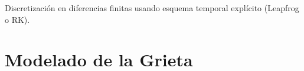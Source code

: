 \documentclass[a4paper,10pt]{exam}
\begin{document}
Discretización en diferencias finitas usando esquema temporal explícito (Leapfrog o RK).
% 
% 
% 

% 

\section{Modelado de la Grieta}
\end{document}

